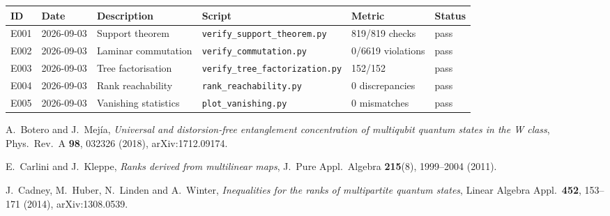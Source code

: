 \documentclass[11pt]{article}
\theoremstyle{definition}
\theoremstyle{remark}
\begin{document}
{
\setlength{\tabcolsep}{6pt}
\renewcommand{\arraystretch}{1.2}
\begin{tabular}{llllll}
\toprule
ID & Date & Description & Script & Metric & Status \\
\midrule
E001 & 2026-09-03 & Support theorem & \texttt{verify\_support\_theorem.py} & 819/819 checks & pass \\
E002 & 2026-09-03 & Laminar commutation & \texttt{verify\_commutation.py} & 0/6619 violations & pass \\
E003 & 2026-09-03 & Tree factorisation & \texttt{verify\_tree\_factorization.py} & 152/152 & pass \\
E004 & 2026-09-03 & Rank reachability & \texttt{rank\_reachability.py} & 0 discrepancies & pass \\
E005 & 2026-09-03 & Vanishing statistics & \texttt{plot\_vanishing.py} & 0 mismatches & pass \\
\bottomrule
\end{tabular}
}

\begin{thebibliography}{9}
A.\ Botero and J.\ Mej\'ia,
\emph{Universal and distorsion-free entanglement concentration of multiqubit quantum
states in the W class}, Phys.\ Rev.\ A \textbf{98}, 032326 (2018),
arXiv:1712.09174.

E.\ Carlini and J.\ Kleppe,
\emph{Ranks derived from multilinear maps},
J.\ Pure Appl.\ Algebra \textbf{215}(8), 1999--2004 (2011).

J.\ Cadney, M.\ Huber, N.\ Linden and A.\ Winter,
\emph{Inequalities for the ranks of multipartite quantum states},
Linear Algebra Appl.\ \textbf{452}, 153--171 (2014), arXiv:1308.0539.
\end{thebibliography}
\end{document}
